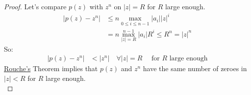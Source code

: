 \begin{proof}
    Let's compare $p(z)$ with $z^n$ on $|z| = R$ for $R$ large enough.\\
    \begin{align*}
        |p(z) - z^n| & \leq n\max_{0 \leq i \leq n - 1} |a_i||z|^i        \\
                     & = n\max_{|z| = R}^{n-1} |a_i| R^i \leq R^n = |z|^n
    \end{align*}
    So:
    \begin{align*}
        |p(z) - z^n| & < |z^n| \quad \forall |z| = R \quad \text{ for } R \text{ large enough}
    \end{align*}
    \underline{Rouche's} Theorem implies that $p(z)$ and $z^n$ have the same number of zeroes in $|z| < R$ for $R$ large enough.\\
\end{proof}
